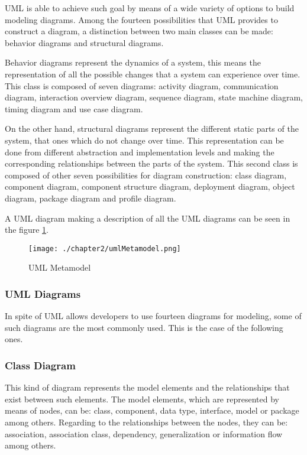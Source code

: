 UML is able to achieve such goal by means of a wide variety of options to build modeling diagrams. Among the fourteen possibilities that UML provides to construct a diagram, a distinction between two main classes can be made: behavior diagrams and structural diagrams.

Behavior diagrams represent the dynamics of a system, this means the representation of all the possible changes that a system can experience over time. This class is composed of seven diagrams: activity diagram, communication diagram, interaction overview diagram, sequence diagram, state machine diagram, timing diagram and use case diagram.

On the other hand, structural diagrams represent the different static parts of the system, that ones which do not change over time. This representation can be done from different abstraction and implementation levels and making the corresponding relationships between the parts of the system. This second class is composed of other seven possibilities for diagram construction: class diagram, component diagram, component structure diagram, deployment diagram, object diagram, package diagram and profile diagram.

A UML diagram making a description of all the UML diagrams can be seen in the figure \ref{fig:UML Metamodel}.

\begin{figure}
\centering
{\texttt{[image: ./chapter2/umlMetamodel.png]}}
\caption{UML Metamodel}
\label{fig:UML Metamodel}
\end{figure}

\subsubsection{UML Diagrams}

In spite of UML allows developers to use fourteen diagrams for modeling, some of such diagrams are the most commonly used. This is the case of the following ones.

\subsubsection*{Class Diagram}

This kind of diagram represents the model elements and the relationships that exist between such elements. The model elements, which are represented by means of nodes, can be: class, component, data type, interface, model or package among others. Regarding to the relationships between the nodes, they can be: association, association class, dependency, generalization or information flow among others.


